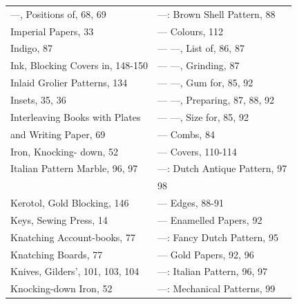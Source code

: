 \documentclass[twoside]{book}
\begin{document}
\begin{center}
\begin{tiny}
\begin{tabular}{l|l}
---, Positions of, 68, 69          & ---: Brown Shell Pattern, 88       \\
Imperial Papers, 33                & --- Colours, 112                   \\
Indigo, 87                         & --- ---, List of, 86, 87           \\
Ink, Blocking Covers in, 148-150   & --- ---, Grinding, 87              \\
Inlaid Grolier Patterns, 134       & --- ---, Gum for, 85, 92           \\
Insets, 35, 36                     & --- ---, Preparing, 87, 88, 92     \\
Interleaving Books with Plates     & --- ---, Size for, 85, 92          \\
    and Writing Paper, 69          & --- Combs, 84                      \\
Iron, Knocking- down, 52           & --- Covers, 110-114                \\
Italian Pattern Marble, 96, 97     & ---: Dutch Antique Pattern, 97     \\
                                   &     98                             \\
Kerotol, Gold Blocking, 146        & --- Edges, 88-91                   \\
Keys, Sewing Press, 14             & --- Enamelled Papers, 92           \\
Knatching Account-books, 77        & ---: Fancy Dutch Pattern, 95       \\
Knatching Boards, 77               & --- Gold Papers, 92, 96            \\
Knives, Gilders', 101, 103, 104    & ---: Italian Pattern, 96, 97       \\
Knocking-down Iron, 52             & ---: Mechanical Patterns, 99       \\

\end{tabular}

\pagebreak

\begin{tabular}{l|l}


\end{tabular}
\end{tiny}
\end{center}
\end{document}
